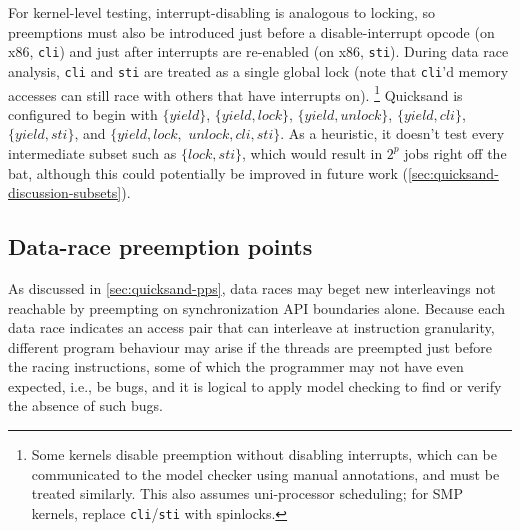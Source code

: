 For kernel-level testing, interrupt-disabling is analogous to locking,
so preemptions must also be introduced
just before a disable-interrupt opcode (on x86, {\tt cli})
and just after interrupts are re-enabled (on x86, {\tt sti}).
During data race analysis, {\tt cli} and {\tt sti} are treated as a single global lock
(note that {\tt cli}'d memory accesses can still race with others that have interrupts on).%
\footnote{Some kernels disable preemption without disabling interrupts,
which can be communicated to the model checker using manual annotations,
and must be treated similarly.
This also assumes uni-processor scheduling; for SMP kernels, replace {\tt cli}/{\tt sti} with spinlocks.}
Quicksand is configured to begin with
$\{yield\}$,
$\{yield,lock\}$,
$\{yield,unlock\}$,
$\{yield,cli\}$,
$\{yield,sti\}$,
and $\{yield,lock,$ $unlock,cli,sti\}$.
As a heuristic, it doesn't test every intermediate subset such as $\{lock,sti\}$,
which would result in $2^p$ jobs right off the bat,
although this could potentially be improved in future work (\cref{sec:quicksand-discussion-subsets}).


\subsection{Data-race preemption points}
\label{sec:quicksand-dr-pps}

As discussed in \cref{sec:quicksand-pps},
data races may beget new interleavings not reachable by preempting on synchronization API boundaries alone.
Because each data race indicates an access pair that can interleave at instruction granularity,
different program behaviour may arise if the threads are preempted just before the racing instructions,
some of which the programmer may not have even expected, i.e., be bugs,
and it is logical to apply model checking to find or verify the absence of such bugs.

